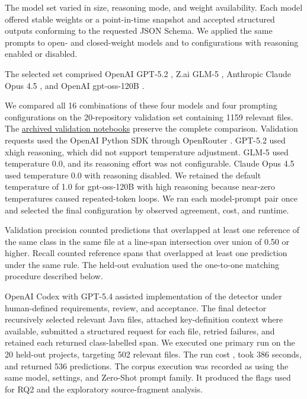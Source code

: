The model set varied in size, reasoning mode, and weight availability. Each model offered stable weights or a point-in-time snapshot and accepted structured outputs conforming to the requested JSON Schema. We applied the same prompts to open- and closed-weight models and to configurations with reasoning enabled or disabled.

The selected set comprised OpenAI GPT-5.2 , Z.ai GLM-5 , Anthropic Claude Opus 4.5 , and OpenAI gpt-oss-120B .

We compared all \num{16} combinations of these four models and four prompting configurations on the \num{20}-repository validation set containing \num{1159} relevant files. The \href{https://github.com/kristoisberg/masters-thesis/tree/9913a7670fce52b135651f95ff18cd505c61b142/scripts/backups}{archived validation notebooks} preserve the complete comparison. Validation requests used the OpenAI Python SDK  through OpenRouter . GPT-5.2 used xhigh reasoning, which did not support temperature adjustment. GLM-5 used temperature \num{0.0}, and its reasoning effort was not configurable. Claude Opus 4.5 used temperature \num{0.0} with reasoning disabled. We retained the default temperature of \num{1.0} for gpt-oss-120B with high reasoning because near-zero temperatures caused repeated-token loops. We ran each model-prompt pair once and selected the final configuration by observed agreement, cost, and runtime.\label{sec:models}

Validation precision counted predictions that overlapped at least one reference of the same class in the same file at a line-span intersection over union of \num{0.50} or higher. Recall counted reference spans that overlapped at least one prediction under the same rule. The held-out evaluation used the one-to-one matching procedure described below.

OpenAI Codex with GPT-5.4  assisted implementation of the detector under human-defined requirements, review, and acceptance. The final detector recursively selected relevant Java files, attached key-definition context where available, submitted a structured request for each file, retried failures, and retained each returned class-labelled span. We executed one primary run on the \num{20} held-out projects, targeting \num{502} relevant files. The run cost , took \num{386} seconds, and returned \num{536} predictions. The corpus execution was recorded as using the same model, settings, and Zero-Shot prompt family. It produced the flags used for RQ2 and the exploratory source-fragment analysis.

